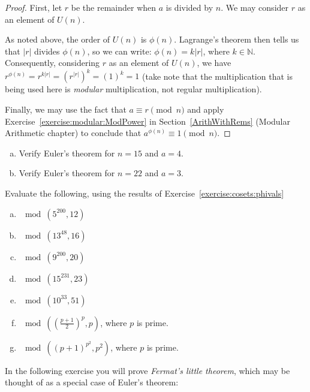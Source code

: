 {\begin{proof}
First, let $r$ be the remainder when $a$ is divided by $n$. We may consider $r$ as an element of $U(n)$.

As noted above, the order of $U(n)$ is $\phi(n)$.  Lagrange's theorem then tells us that $|r|$ divides $\phi(n)$, so we can write: $\phi(n) = k|r|$, where $k \in {\mathbb N}$.   Consequently, considering $r$ as an element of $U(n)$, we have $r^{\phi(n)} = r^{k|r|} = (r^{|r|})^k = (1)^k=1$ (take note that the multiplication that is being used here is \emph{modular} multiplication, not regular multiplication). 

Finally, we may use  the fact that $a \equiv r \pmod{n}$ and apply Exercise~\ref{exercise:modular:ModPower} in Section~\ref{ArithWithRems} (Modular Arithmetic chapter) to conclude that $a^{\phi(n)} \equiv 1 \pmod{n}$.

\hspace*{0.5in}
\end{proof}

\begin{exercise}{}
\begin{enumerate}[(a)]
\item
Verify Euler's theorem for $n = 15$ and $a = 4$.
\item
Verify Euler's theorem for $n = 22$ and $a = 3$.
\end{enumerate}
\end{exercise}


\begin{exercise}{}
Evaluate the following, using the results of Exercise~\ref{exercise:cosets:phivals}
\begin{multicols}{2}
\begin{enumerate}[(a)]
\item
$\mod(5^{200},12)$
\item
$\mod(13^{48},16)$
\item
$\mod(9^{200},20)$
\item
$\mod(15^{231},23)$
\item
$\mod(10^{33},51)$
\item
$\mod \left( \left( \frac{p+1}{2} \right)^p,p\right)$, where $p$ is prime.
\item
$\mod ( (p+1)^{p^2},p^2)$, where $p$ is prime.
\end{enumerate}
\end{multicols}
\end{exercise}

In the following exercise you will prove \emph{Fermat's little theorem}, which may be thought of as a special case of Euler's theorem:

}
